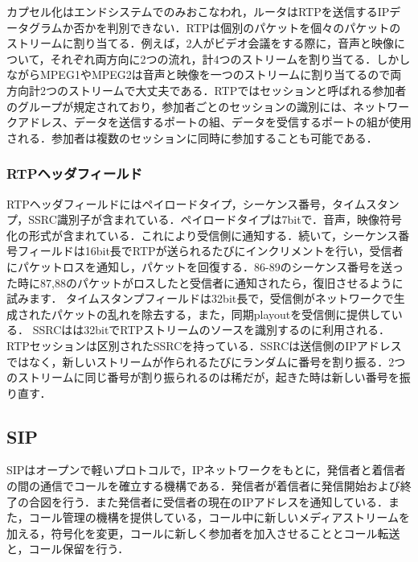 カプセル化はエンドシステムでのみおこなわれ，ルータはRTPを送信するIPデータグラムか否かを判別できない．RTPは個別のパケットを個々のパケットのストリームに割り当てる．例えば，2人がビデオ会議をする際に，音声と映像について，それぞれ両方向に2つの流れ，計4つのストリームを割り当てる．しかしながらMPEG1やMPEG2は音声と映像を一つのストリームに割り当てるので両方向計2つのストリームで大丈夫である．RTPではセッションと呼ばれる参加者のグループが規定されており，参加者ごとのセッションの識別には、ネットワークアドレス、データを送信するポートの組、データを受信するポートの組が使用される．参加者は複数のセッションに同時に参加することも可能である．

\subsubsection{RTPヘッダフィールド}
RTPヘッダフィールドにはペイロードタイプ，シーケンス番号，タイムスタンプ，SSRC識別子が含まれている．ペイロードタイプは7bitで．音声，映像符号化の形式が含まれている．これにより受信側に通知する．続いて，シーケンス番号フィールドは16bit長でRTPが送られるたびにインクリメントを行い，受信者にパケットロスを通知し，パケットを回復する．86-89のシーケンス番号を送った時に87,88のパケットがロスしたと受信者に通知されたら，復旧させるように試みます．
タイムスタンプフィールドは32bit長で，受信側がネットワークで生成されたパケットの乱れを除去する，また，同期playoutを受信側に提供している．
SSRCはは32bitでRTPストリームのソースを識別するのに利用される．RTPセッションは区別されたSSRCを持っている．SSRCは送信側のIPアドレスではなく，新しいストリームが作られるたびにランダムに番号を割り振る．2つのストリームに同じ番号が割り振られるのは稀だが，起きた時は新しい番号を振り直す．

\subsection{SIP}
SIPはオープンで軽いプロトコルで，IPネットワークをもとに，発信者と着信者の間の通信でコールを確立する機構である．発信者が着信者に発信開始および終了の合図を行う．また発信者に受信者の現在のIPアドレスを通知している．また，コール管理の機構を提供している，コール中に新しいメディアストリームを加える，符号化を変更，コールに新しく参加者を加入させることとコール転送と，コール保留を行う．

